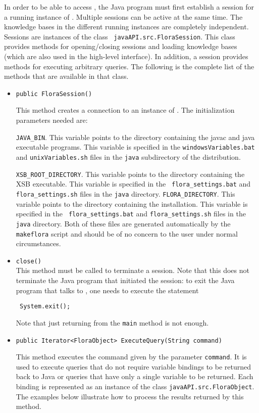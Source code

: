 In order to be able to access \FLSYSTEM, the Java program must first establish
a session for a running instance of \FLSYSTEM. Multiple sessions can be active
at the same time. The knowledge bases in the different running instances
are completely independent. Sessions are instances of
the class {\tt
javaAPI.src.FloraSession}. This class provides methods
for opening/closing sessions and loading \FLSYSTEM knowledge bases
(which are also used in the high-level
interface). In addition, a session provides 
methods for executing arbitrary \FLSYSTEM queries. The following is the complete
list of the methods that are available in that class.
\begin{itemize}
\item
\begin{verbatim}
public FloraSession()
\end{verbatim}
    This method creates a connection to an instance of \FLSYSTEM.
The initialization parameters needed are:

{\tt JAVA\_BIN}. This variable points to the directory containing
the javac and java executable programs. This variable is specified in
the {\tt windowsVariables.bat} and  {\tt unixVariables.sh}  files in the
{\tt java} subdirectory of the \FLSYSTEM distribution.

{\tt XSB\_ROOT\_DIRECTORY}. This variable points to the directory
containing the XSB executable. This variable is specified in the {\tt
  flora\_settings.bat} and {\tt flora\_settings.sh} files in the {\tt java}
directory.  {\tt FLORA\_DIRECTORY}. This variable points to the directory
containing the \FLSYSTEM installation. This variable is specified in the {\tt
  flora\_settings.bat} and {\tt flora\_settings.sh} files in the {\tt java}
directory.  Both of these files are generated automatically by the {\tt
  makeflora} script and should be of no concern to the user under normal
circumstances.
\item {\tt close()} \\
  This method must be called to terminate a \FLSYSTEM session. Note that this does
  not terminate the Java program that initiated the session:
  to exit the Java program that talks to \FLSYSTEM, one needs to execute
  the statement
\begin{verbatim}
 System.exit();  
\end{verbatim}
  Note that just returning from the {\tt main} method is not enough. 

\item
\begin{verbatim}
public Iterator<FloraObject> ExecuteQuery(String command)
\end{verbatim}
    This method executes the \FLSYSTEM command given by the
parameter {\tt command}.  It is used to execute \FLSYSTEM queries that
do not require variable bindings to be returned back to Java or queries that
have only
a single variable to be returned. Each binding is represented as
an instance of the class {\tt javaAPI.src.FloraObject}.
The examples below illustrate how to process the results returned by this
method.


\end{itemize}
